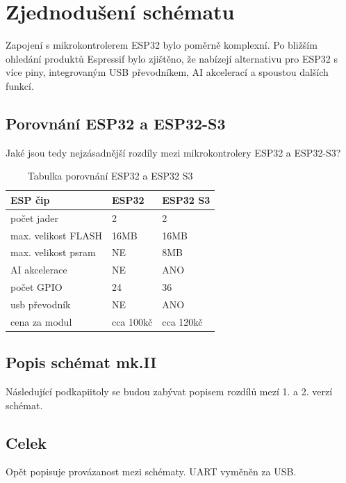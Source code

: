 \section{Zjednodušení schématu}
Zapojení s mikrokontrolerem ESP32 bylo poměrně komplexní. Po bližším ohledání produktů Espressif bylo zjištěno, že nabízejí alternativu pro ESP32 s více piny, integrovaným USB převodníkem, AI akcelerací a spoustou dalších funkcí.
\subsection{Porovnání ESP32 a ESP32-S3}
Jaké jsou tedy nejzásadnější rozdíly mezi mikrokontrolery ESP32 a ESP32-S3?

\begin{table}[htbp!]
	\centering
	\begin{tabularx}{\textwidth}{|X|X|X|}\hline
		ESP čip                  & ESP32     & ESP32 S3  \\ \hline
		počet jader              & 2         & 2         \\ \hline
		max. velikost \ac{FLASH} & 16MB      & 16MB      \\ \hline
		max. velikost \ac{psram} & NE        & 8MB       \\ \hline
		AI akcelerace            & NE        & ANO       \\ \hline
		počet GPIO               & 24        & 36        \\ \hline
		usb převodník            & NE        & ANO       \\ \hline
		cena za modul            & cca 100kč & cca 120kč \\ \hline
	\end{tabularx}
	\label{tab:Tabulka_porovnani_ESP_ESP_S3}
	\caption{Tabulka porovnání ESP32 a ESP32 S3}
	\cite{ESP32_datasheet}
	\cite{ESP32_S3_datasheet}
	\cite{esp32-module_schematics}
	\cite{ESP32-S3-module_schematics}
	\cite{espressif}
\end{table}



\subsection{Popis schémat mk.II}
Následující podkapiitoly se budou zabývat popisem rozdílů mezí 1. a 2. verzí schémat.

\subsection{Celek}
Opět popisuje provázanost mezi schématy. UART vyměněn za USB.
\newpage



